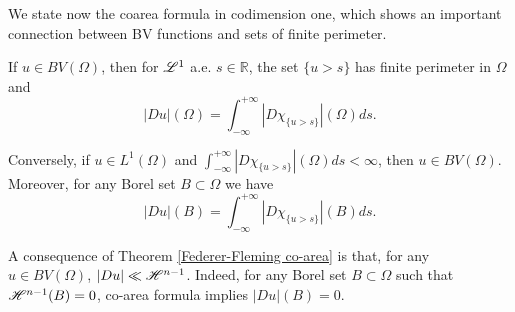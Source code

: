 We state now the coarea formula in codimension one, which shows an important connection between BV functions and sets of finite perimeter.

\begin{theorem} \label{Federer-Fleming co-area} 
If $u \in BV(\Omega)$, then for $\mathscr{L}^{1}$ a.e. $s \in \mathbb{R}$, the set $\{ u > s \}$ has finite perimeter in $\Omega$ and
\[ |Du|(\Omega) = \int_{-\infty}^{+\infty} |D\chi_{\{u > s\}}|(\Omega) ds. \]

Conversely, if $u \in L^{1}(\Omega)$ and $\int_{-\infty}^{+\infty} |D\chi_{\{u > s\}}|(\Omega) ds < \infty$, then $u \in BV(\Omega)$.
\\
Moreover, for any Borel set $B \subset \Omega$ we have
\[ |Du|(B) = \int_{-\infty}^{+\infty} |D\chi_{\{u > s\}}|(B) ds. \]
\end{theorem}
%
%
% 
%
%
%
%
%



\begin{remark} \label{BVabscont} A consequence of Theorem \ref{Federer-Fleming co-area} is that, for any $u \in BV(\Omega)$, $|Du| \ll \mathscr{H}^{n - 1}$. Indeed, for any Borel set $B \subset \Omega$ such that $\mathscr{H}^{n - 1}(B) = 0$, co-area formula implies $|Du|(B) = 0$.
\end{remark}


